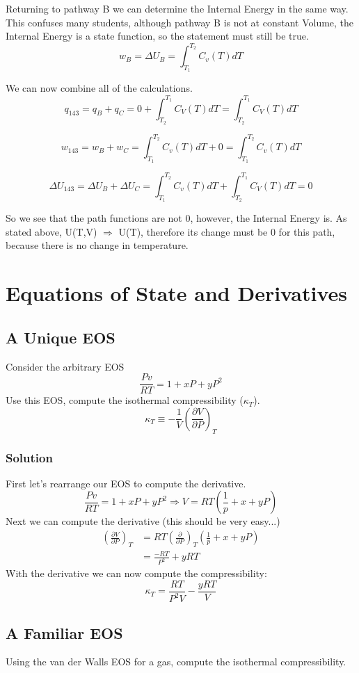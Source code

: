 \documentclass{article}
\newcommand{\be}{\begin{equation}}
\newcommand{\ee}{\end{equation}}
\newcommand{\pd}{\partial}
\begin{document}
Returning to pathway B we can determine the Internal Energy in the same way.
This confuses many students, although pathway B is not at constant Volume, the Internal Energy is a state function, so the statement must still be true.
\be
w_B = \Delta U_B = \int_{T_1}^{T_2} C_v(T) dT
\ee

We can now combine all of the calculations.
\be
q_{143} = q_B + q_C = 0 + \int_{T_2}^{T_1} C_V(T) dT = \int_{T_2}^{T_1} C_V(T) dT
\ee

\be
w_{143} = w_B + w_C = \int_{T_1}^{T_2} C_v(T) dT + 0 = \int_{T_1}^{T_2} C_v(T) dT
\ee

\be
\Delta U_{143} = \Delta U_B + \Delta U_C = \int_{T_1}^{T_2} C_v(T) dT + \int_{T_2}^{T_1} C_V(T) dT = 0
\ee

So we see that the path functions are not 0, however, the Internal Energy is. 
As stated above, U(T,V) $\Rightarrow$ U(T), therefore its change must be 0 for this path, because there is no change in temperature.

\section{Equations of State and Derivatives}

\subsection{A Unique EOS}
Consider the arbitrary EOS
\be
\frac{Pv}{RT} = 1 + xP + yP^2
\ee
Use this EOS, compute the isothermal compressibility ($\kappa_T$). 
\be
\kappa_T \equiv -\frac{1}{V}\left(\frac{\pd V}{\pd P}\right)_T
\ee

\subsubsection{Solution}
First let's rearrange our EOS to compute the derivative.
\be
\frac{Pv}{RT} = 1 + xP + yP^2 \Rightarrow V = RT\left(\frac{1}{p} + x + yP\right)
\ee
Next we can compute the derivative (this should be very easy...)
\be
\begin{split}
\left(\frac{\pd V}{\pd P}\right)_T &= RT \left(\frac{\pd }{\pd P}\right)_T \left(\frac{1}{p} + x + yP\right) \\
&= \frac{-RT}{P^2} + yRT
\end{split}
\ee
With the derivative we can now compute the compressibility:
\be
\kappa_T = \frac{RT}{P^2V} - \frac{yRT}{V}
\ee


\subsection{A Familiar EOS}
Using the van der Walls EOS for a gas, compute the isothermal compressibility. 
\end{document}
